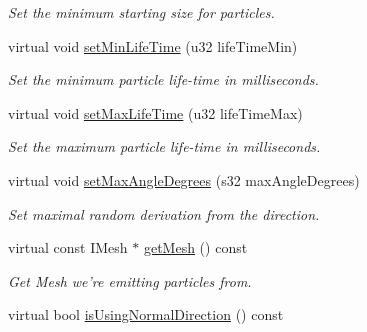 \begin{DoxyCompactItemize}
\begin{DoxyCompactList}\small\item\em Set the minimum starting size for particles. \end{DoxyCompactList}\item 
\hypertarget{classirr_1_1scene_1_1_c_particle_mesh_emitter_a2018ce7d553bf8e1095d41c6576c6bcc}{virtual void \hyperlink{classirr_1_1scene_1_1_c_particle_mesh_emitter_a2018ce7d553bf8e1095d41c6576c6bcc}{set\-Min\-Life\-Time} (u32 life\-Time\-Min)}\label{classirr_1_1scene_1_1_c_particle_mesh_emitter_a2018ce7d553bf8e1095d41c6576c6bcc}

\begin{DoxyCompactList}\small\item\em Set the minimum particle life-\/time in milliseconds. \end{DoxyCompactList}\item 
\hypertarget{classirr_1_1scene_1_1_c_particle_mesh_emitter_ab9d119186b0066db5878a662416bc4f1}{virtual void \hyperlink{classirr_1_1scene_1_1_c_particle_mesh_emitter_ab9d119186b0066db5878a662416bc4f1}{set\-Max\-Life\-Time} (u32 life\-Time\-Max)}\label{classirr_1_1scene_1_1_c_particle_mesh_emitter_ab9d119186b0066db5878a662416bc4f1}

\begin{DoxyCompactList}\small\item\em Set the maximum particle life-\/time in milliseconds. \end{DoxyCompactList}\item 
\hypertarget{classirr_1_1scene_1_1_c_particle_mesh_emitter_a99c8c694dd0b45b0d1a89a1c8aa2d201}{virtual void \hyperlink{classirr_1_1scene_1_1_c_particle_mesh_emitter_a99c8c694dd0b45b0d1a89a1c8aa2d201}{set\-Max\-Angle\-Degrees} (s32 max\-Angle\-Degrees)}\label{classirr_1_1scene_1_1_c_particle_mesh_emitter_a99c8c694dd0b45b0d1a89a1c8aa2d201}

\begin{DoxyCompactList}\small\item\em Set maximal random derivation from the direction. \end{DoxyCompactList}\item 
\hypertarget{classirr_1_1scene_1_1_c_particle_mesh_emitter_a647868757a77657fd6f0e72d62bed7e3}{virtual const I\-Mesh $\ast$ \hyperlink{classirr_1_1scene_1_1_c_particle_mesh_emitter_a647868757a77657fd6f0e72d62bed7e3}{get\-Mesh} () const }\label{classirr_1_1scene_1_1_c_particle_mesh_emitter_a647868757a77657fd6f0e72d62bed7e3}

\begin{DoxyCompactList}\small\item\em Get Mesh we're emitting particles from. \end{DoxyCompactList}\item 
\hypertarget{classirr_1_1scene_1_1_c_particle_mesh_emitter_a60212f14cbcc7e70b517f6c5dfbfd6d9}{virtual bool \hyperlink{classirr_1_1scene_1_1_c_particle_mesh_emitter_a60212f14cbcc7e70b517f6c5dfbfd6d9}{is\-Using\-Normal\-Direction} () const }\label{classirr_1_1scene_1_1_c_particle_mesh_emitter_a60212f14cbcc7e70b517f6c5dfbfd6d9}


\end{DoxyCompactItemize}
